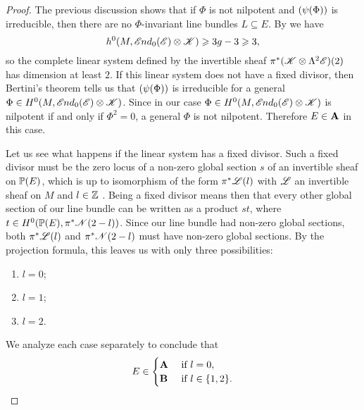 \documentclass[A4paper, 12pt, british, reqno]{amsart}
\let\div\relax
\DeclareMathOperator{\div}{div}
\newcommand{\ot}{\otimes}
\newcommand{\1}{\mathbbm{1}}
\begin{document}
\begin{lm}
\begin{proof}
	The previous discussion shows that if $\Phi$ is not nilpotent and $\div(\psi(\Phi))$ is irreducible, then there are no $\Phi$-invariant line bundles $L\subseteq E$.
	By  we have
	\[ h^{0}(M,\sEnd_{0}(\E)\ot \sK)\geqslant 3g-3\geqslant 3, \]
	so the complete linear system defined by the invertible sheaf $\pi^{*}(\sK\ot\Lambda^{2}\E)(2)$ has dimension at least $2$.
	If this linear system does not have a fixed divisor, then Bertini's theorem \cite[Theorem 7.19]{iit82} tells us that $\div(\psi(\Phi))$ is irreducible for a general $\Phi\in H^{0}(M,\sEnd_{0}(\E)\ot \sK)$.
	Since in our case $\Phi\in H^{0}(M,\sEnd_{0}(\E)\ot \sK)$ is nilpotent if and only if $\Phi^{2}=0$, a general $\Phi$ is not nilpotent.
	Therefore $E\in \bfA$ in this case.

	Let us see what happens if the linear system has a fixed divisor.
	Such a fixed divisor must be the zero locus of a non-zero global section $s$ of an invertible sheaf on $\P(E)$, which is up to isomorphism of the form $\pi^{*}\L(l)$ with $\L$ an invertible sheaf on $M$ and $l\in \Z$ \cite[Exercise II.7.9]{har77}.
	Being a fixed divisor means then that every other global section of our line bundle can be written as a product $st$, where $t\in H^{0}(\P(E),\pi^{*}\sN(2-l))$.
	Since our line bundle had non-zero global sections, both $\pi^{*}\L(l)$ and $\pi^{*}\sN(2-l)$ must have non-zero global sections.
	By the projection formula, this leaves us with only three possibilities:
	\begin{enumerate}[label=\alph*)]
	    \item $l=0$;
	    \item $l=1$;
	    \item $l=2$.
	\end{enumerate}
	We analyze each case separately to conclude that
	\[ E\in \begin{cases} \bfA & \text{ if }l=0, \\
	    \bfB & \text{ if }l\in \{1,2\}.
	\end{cases} \]


\end{proof}
\end{lm}
\end{document}
